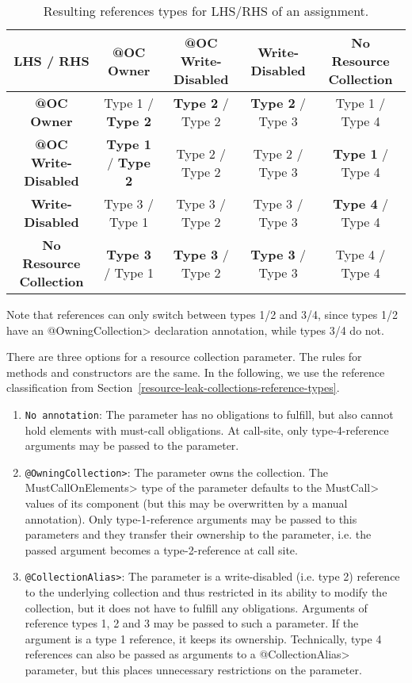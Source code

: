 \begin{table}[ht]
    \centering
    \caption{Resulting references types for LHS/RHS of an assignment.}
    \begin{tabular}{|c|c|c|c|c|}
        \hline
        \textbf{LHS / RHS} & \textbf{@OC Owner} & \textbf{@OC Write-Disabled} & \textbf{Write-Disabled} & \textbf{No Resource Collection} \\ \hline
        \textbf{@OC Owner} & Type 1 / \textbf{Type 2} & \textbf{Type 2} / Type 2 & \textbf{Type 2} / Type 3 & Type 1 / Type 4 \\ \hline
        \textbf{@OC Write-Disabled} & \textbf{Type 1} / \textbf{Type 2} & Type 2 / Type 2 & Type 2 / Type 3 & \textbf{Type 1} / Type 4 \\ \hline
        \textbf{Write-Disabled} & Type 3 / Type 1 & Type 3 / Type 2 & Type 3 / Type 3 & \textbf{Type 4} / Type 4 \\ \hline
        \textbf{No Resource Collection} & \textbf{Type 3} / Type 1 & \textbf{Type 3} / Type 2 & \textbf{Type 3} / Type 3  & Type 4 / Type 4 \\ \hline
    \end{tabular}
    \label{tab:abstract_domain_results_with_errors}
\end{table}

Note that references can only switch between types 1/2 and 3/4, since types 1/2 have an \<@OwningCollection> declaration annotation, while types 3/4 do not.

There are three options for a resource collection parameter. The rules for methods and constructors are the same. In the following, we use the reference classification from Section~\ref{resource-leak-collections-reference-types}.
\begin{enumerate}
  \item \texttt{No annotation}: The parameter has no obligations to fulfill, but also cannot hold elements with must-call obligations. At call-site, only type-4-reference arguments may be passed to the parameter.
  \item \texttt{\<@OwningCollection>}: The parameter owns the collection. The \<MustCallOnElements> type of the parameter defaults to the \<MustCall> values of its component (but this may be overwritten by a manual annotation). Only type-1-reference arguments may be passed to this parameters and they transfer their ownership to the parameter, i.e. the passed argument becomes a type-2-reference at call site.
  \item \texttt{\<@CollectionAlias>}: The parameter is a write-disabled (i.e. type 2) reference to the underlying collection and thus restricted in its ability to modify the collection, but it does not have to fulfill any obligations. Arguments of reference types 1, 2 and 3 may be passed to such a parameter. If the argument is a type 1 reference, it keeps its ownership. Technically, type 4 references can also be passed as arguments to a \<@CollectionAlias> parameter, but this places unnecessary restrictions on the parameter.
\end{enumerate}

